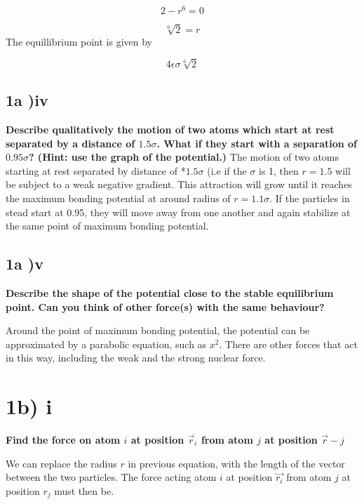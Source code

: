\documentclass[a4paper,10pt,english]{article}
\begin{document}
\begin{equation}
2-r^6=0
\end{equation}

\begin{equation}
\sqrt[6]{2}= r
\end{equation}
The equillibrium point is given by 

\begin{equation}
4\epsilon \sigma \sqrt[6]{2}
\end{equation}




\subsection*{1a )iv}
\textbf{Describe qualitatively the motion of two atoms which start at rest separated by a distance of
$1.5\sigma$. What if they start with a separation of $0.95\sigma$? (Hint: use the graph of the potential.)}
The motion of two atoms starting at rest separated by distance of *$1.5 \sigma$ (i.e if the $\sigma$ is 1, then $r = 1.5$  will be subject to a weak negative gradient. This attraction will grow until it reaches the maximum bonding potential at around radius of $r = 1.1 \sigma$.
If the particles in stead start at 0.95, they will move away from one another and again stabilize at the same point of maximum bonding potential.

\subsection*{1a )v}
\textbf{Describe the shape of the potential close to the stable equilibrium point. Can you think of other
force(s) with the same behaviour?}

Around the point of maximum bonding potential, the potential can be approximated by a parabolic equation, such as $x^2$. There are other forces that act in this way, including the weak and the strong nuclear force.

\section*{1b) i}
\textbf{Find the force on atom $i$ at position $\vec{r}_i$
from atom $j$ at position $\vec{r}-j$}

We can replace the radius $r$ in previous equation, with the length of the vector between the two particles. The  force acting atom $i$ at position $\vec{r_i}$ from atom $j$ at position $r_j$ must then be. 
\end{document}

